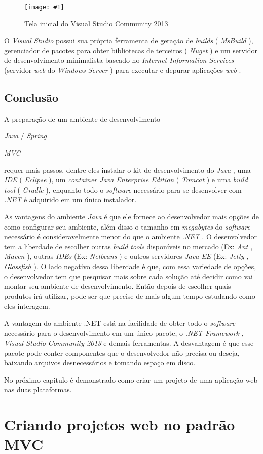 \documentclass[a4paper,12pt]{article}
\newcommand{\spring} {
\lang{Java}/\est{Spring} \sigla{MVC}
}
\newcommand{\figura}[3] {
	\begin{figure}[ht]
		\centering
		\texttt{[image: \#1]}
		\caption{#2}
		\label{#3}
	\end{figure}
	\FloatBarrier
}
\newcommand{\est}[1] {
	\textit{#1}
}
\newcommand{\sigla}[1] {
	\textit{#1}
}
\newcommand{\lang}[1] {
	\textit{#1}
}
\begin{document}
\figura{vs2.png}{Tela inicial do Visual Studio Community 2013}{fig:vs2}

O \est{Visual Studio} possui sua própria ferramenta de geração de \est{builds} (\est{MsBuild}), gerenciador de pacotes para obter bibliotecas de terceiros (\est{Nuget}) e um servidor de desenvolvimento minimalista baseado no \est{Internet Information Services} (servidor \est{web} do \est{Windows Server}) para executar e depurar aplicações \est{web}.  

\subsection{Conclusão}

A preparação de um ambiente de desenvolvimento \spring requer mais passos, dentre eles instalar o kit de desenvolvimento do \est{Java}, uma \sigla{IDE} (\est{Eclipse}), um \est{container Java Enterprise Edition} (\est{Tomcat}) e uma \est{build tool} (\est{Gradle}), enquanto  todo o \est{software} necessário para se desenvolver com \sigla{.NET} é adquirido em um único instalador.

As vantagens do ambiente \lang{Java} é que ele fornece ao desenvolvedor mais opções de como configurar seu ambiente, além disso o tamanho em \est{megabytes} do \est{software} necessário é consideravelmente menor do que o ambiente \sigla{.NET}. O desenvolvedor tem a liberdade de escolher outras \est{build tools} disponíveis no mercado (Ex: \est{Ant}, \est{Maven}), outras \sigla{IDEs} (Ex: \est{Netbeans}) e outros servidores \est{Java EE} (Ex: \est{Jetty}, \est{Glassfish}). O lado negativo dessa liberdade é que, com  essa variedade de opções, o desenvolvedor tem que pesquisar mais sobre cada solução até decidir como vai montar seu ambiente de desenvolvimento. Então depois de escolher quais produtos irá utilizar, pode ser que precise de mais algum tempo estudando como eles interagem.

A vantagem do ambiente .NET está na facilidade de obter todo o \est{software} necessário para o desenvolvimento em um único pacote, o \est{.NET Framework}, \est{Visual Studio Community 2013} e demais ferramentas. A desvantagem é que esse pacote pode conter componentes que o desenvolvedor não precisa ou deseja, baixando arquivos desnecessários e tomando espaço em disco.

No próximo capitulo é demonstrado como criar um projeto de uma aplicação web nas duas plataformas.

\newpage
\section{Criando projetos web no padrão MVC}
\end{document}
